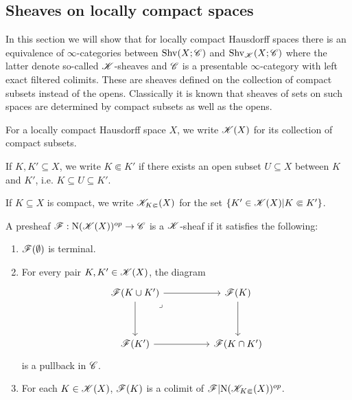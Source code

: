 \documentclass[../../thesis.tex]{subfiles}
\begin{document}
\subsection{Sheaves on locally compact spaces}
In this section we will show that for locally compact Hausdorff spaces there is an equivalence of $\infty$-categories between $\mathrm{Shv}(X;\mathscr{C})$ and $\mathrm{Shv}_{\mathscr{K}}(X;\mathscr{C})$ where the latter denote so-called $\mathscr{K}$-sheaves and $\mathscr{C}$ is a presentable $\infty$-category with left exact filtered colimits.
These are sheaves defined on the collection of compact subsets instead of the opens.
Classically it is known that sheaves of sets on such spaces are determined by compact subsets as well as the opens.
\begin{definition}
    For a locally compact Hausdorff space $X$, we write $\mathscr{K}(X)$ for its collection of compact subsets.
\end{definition}
\begin{definition}
    If $K, K' \subseteq X$, we write $K \Subset K'$ if there exists an open subset $U\subseteq X$ between $K$ and $K'$, i.e. $K \subseteq U \subseteq K'$.
\end{definition}
\begin{definition}
    If $K\subseteq X$ is compact, we write $\mathscr{K}_{K\Subset}(X)$ for the set $\{ K'\in \mathscr{K}(X) | K \Subset K' \}$.
\end{definition}
\begin{definition}
    A presheaf $\mathscr{F}:\mathrm{N}(\mathscr{K}(X))^{op}\to \mathscr{C}$ is a $\mathscr{K}$-sheaf if it satisfies the following:
    \begin{enumerate}
        \item $\mathscr{F}(\emptyset)$ is terminal.
        \item For every pair $K,K'\in \mathscr{K}(X)$, the diagram
              \[\begin{tikzcd}
                      {\F(K \cup K')} && {\F(K)} \\
                      \\
                      {\F(K')} && {\F(K\cap K')}
                      \arrow[from=1-3, to=3-3]
                      \arrow[from=3-1, to=3-3]
                      \arrow[from=1-1, to=3-1]
                      \arrow["\lrcorner"{anchor=center, pos=0.125}, draw=none, from=1-1, to=3-3]
                      \arrow[from=1-1, to=1-3]
                  \end{tikzcd}\]
              is a pullback in $\mathscr{C}$.
        \item For each $K\in \mathscr{K}(X)$, $\mathscr{F}(K)$ is a colimit of $\mathscr{F}|\mathrm{N}(\mathscr{K}_{K\Subset}(X))^{op}$.
    \end{enumerate}
\end{definition}
\end{document}
